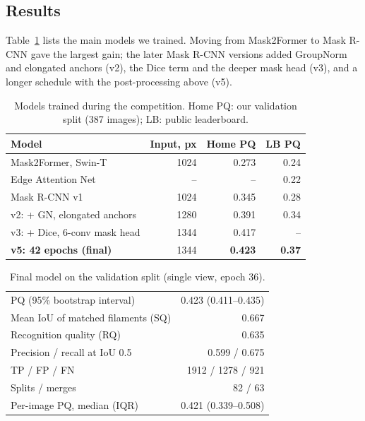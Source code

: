 \documentclass[sigconf]{acmart}
\begin{document}
\subsection{Results}
    Table~\ref{tab:models} lists the main models we trained. Moving from Mask2Former to Mask R-CNN gave the largest gain; the later Mask R-CNN versions added GroupNorm and elongated anchors (v2), the Dice term and the deeper mask head (v3), and a longer schedule with the post-processing above (v5).

\begin{table}[t]
\caption{Models trained during the competition. Home PQ: our validation split (387 images); LB: public leaderboard.}
\label{tab:models}
\small
\setlength{\tabcolsep}{4pt}
\begin{tabular}{@{}lrrr@{}}
\toprule
Model & Input, px & Home PQ & LB PQ \\
\midrule
Mask2Former, Swin-T~\cite{cheng2022mask2former} & 1024 & 0.273 & 0.24 \\
Edge Attention Net & -- & -- & 0.22 \\
Mask R-CNN v1 & 1024 & 0.345 & 0.28 \\
\quad v2: + GN, elongated anchors & 1280 & 0.391 & 0.34 \\
\quad v3: + Dice, 6-conv mask head & 1344 & 0.417 & -- \\
\quad \textbf{v5: 42 epochs (final)} & 1344 & \textbf{0.423} & \textbf{0.37} \\
\bottomrule
\end{tabular}
\end{table}

\begin{table}[t]
\caption{Final model on the validation split (single view, epoch 36).}
\label{tab:final}
\small
\begin{tabular}{lr}
\toprule
PQ (95\% bootstrap interval) & 0.423 (0.411--0.435) \\
Mean IoU of matched filaments (SQ) & 0.667 \\
Recognition quality (RQ) & 0.635 \\
Precision / recall at IoU 0.5 & 0.599 / 0.675 \\
TP / FP / FN & 1912 / 1278 / 921 \\
Splits / merges & 82 / 63 \\
Per-image PQ, median (IQR) & 0.421 (0.339--0.508) \\
\bottomrule
\end{tabular}
\end{table}
\end{document}
